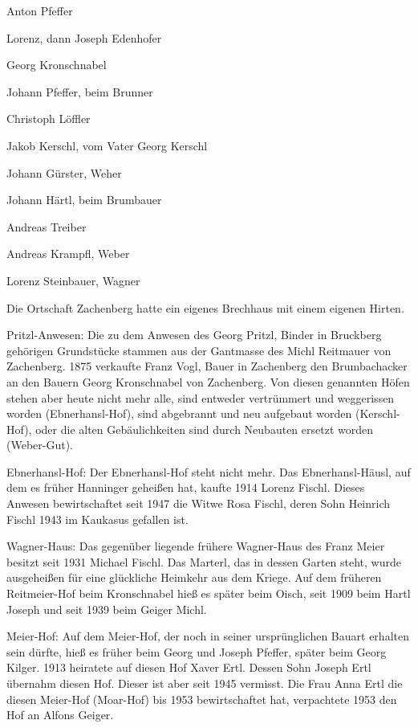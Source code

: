 \documentclass{book}
\begin{document}
Anton Pfeffer

Lorenz, dann Joseph Edenhofer

Georg Kronschnabel

Johann Pfeffer, beim Brunner

Christoph Löffler

Jakob Kerschl, vom Vater Georg Kerschl

Johann Gürster, Weher

Johann Härtl, beim Brumbauer

Andreas Treiber

Andreas Krampfl, Weber

Lorenz Steinbauer, Wagner



Die Ortschaft Zachenberg hatte ein eigenes Brechhaus mit einem eigenen Hirten.

Pritzl-Anwesen: Die zu dem Anwesen des Georg Pritzl, Binder in Bruckberg
gehörigen Grundstücke stammen aus der Gantmasse des Michl Reitmauer von
Zachenberg. 1875 verkaufte Franz Vogl, Bauer in Zachenberg den Brumbachacker an
den Bauern Georg Kronschnabel von Zachenberg. Von diesen genannten Höfen stehen
aber heute nicht mehr alle, sind entweder vertrümmert und weggerissen worden
(Ebnerhansl-Hof), sind abgebrannt und neu aufgebaut worden (Kerschl-Hof), oder
die alten Gebäulichkeiten sind durch Neubauten ersetzt worden (Weber-Gut).

Ebnerhansl-Hof: Der Ebnerhansl-Hof steht nicht mehr. Das Ebnerhansl-Häusl, auf
dem es früher Hanninger geheißen hat, kaufte 1914 Lorenz Fischl. Dieses Anwesen
bewirtschaftet seit 1947 die Witwe Rosa Fischl, deren Sohn Heinrich Fischl 1943
im Kaukasus gefallen ist.

Wagner-Haus: Das gegenüber liegende frühere Wagner-Haus des Franz Meier besitzt
seit 1931 Michael Fischl. Das Marterl, das in dessen Garten steht, wurde
ausgeheißen für eine glückliche Heimkehr aus dem Kriege. Auf dem früheren
Reitmeier-Hof beim Kronschnabel hieß es später beim Oisch, seit 1909 beim Hartl
Joseph und seit 1939 beim Geiger Michl.

Meier-Hof: Auf dem Meier-Hof, der noch in seiner ursprünglichen Bauart erhalten
sein dürfte, hieß es früher beim Georg und Joseph Pfeffer, später beim Georg
Kilger. 1913 heiratete auf diesen Hof Xaver Ertl. Dessen Sohn Joseph Ertl
übernahm diesen Hof. Dieser ist aber seit 1945 vermisst. Die Frau Anna Ertl die
diesen Meier-Hof (Moar-Hof) bis 1953 bewirtschaftet hat, verpachtete 1953 den
Hof an Alfons Geiger.
\end{document}
